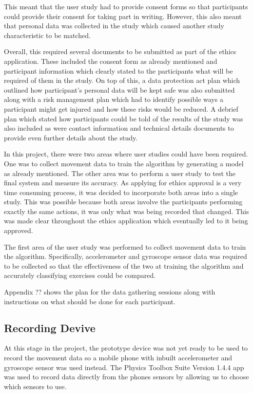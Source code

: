 This meant that the user study had to provide consent forms so that participants could provide their consent for taking part in writing. However, this also meant that personal data was collected in the study which caused another study characteristic to be matched.

Overall, this required several documents to be submitted as part of the ethics application. These included the consent form as already mentioned and participant information which clearly stated to the participants what will be required of them in the study. On top of this, a data protection act plan which outlined how participant’s personal data will be kept safe was also submitted along with a risk management plan which had to identify possible ways a participant might get injured and how these risks would be reduced. A debrief plan which stated how participants could be told of the results of the study was also included as were contact information and technical details documents to provide even further details about the study.

In this project, there were two areas where user studies could have been required. One was to collect movement data to train the algorithm by generating a model as already mentioned. The other area was to perform a user study to test the final system and measure its accuracy. As applying for ethics approval is a very time consuming process, it was decided to incorporate both areas into a single study. This was possible because both areas involve the participants performing exactly the same actions, it was only what was being recorded that changed. This was made clear throughout the ethics application which eventually led to it being approved.

The first area of the user study was performed to collect movement data to train the algorithm. Specifically, accelerometer and gyroscope sensor data was required to be collected so that the effectiveness of the two at training the algorithm and accurately classifying exercises could be compared.

Appendix ?? shows the plan for the data gathering sessions along with instructions on what should be done for each participant.

\subsection{Recording Devive}
At this stage in the project, the prototype device was not yet ready to be used to record the movement data so a mobile phone with inbuilt accelerometer and gyroscope sensor was used instead. The Physics Toolbox Suite Version 1.4.4 app \cite{vieyra2016} was used to record data directly from the phones sensors by allowing us to choose which sensors to use.

